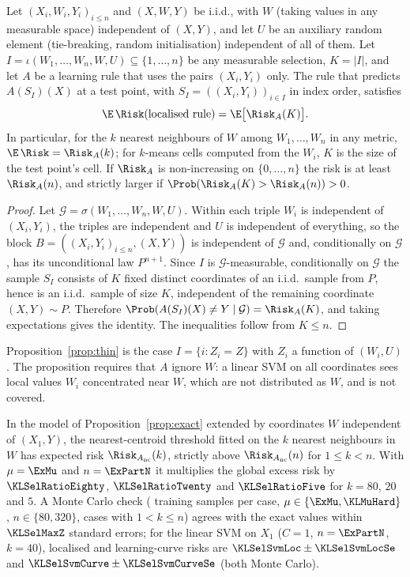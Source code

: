 \begin{proposition}\label{prop:select}
Let $(X_i,W_i,Y_i)_{i\le n}$ and $(X,W,Y)$ be i.i.d., with $W$ (taking values in any measurable space) independent of $(X,Y)$, and let $U$ be an auxiliary random element (tie-breaking, random initialisation) independent of all of them. Let $I=\iota(W_1,\dots,W_n,W,U)\subseteq\{1,\dots,n\}$ be any measurable selection, $K=|I|$, and let $A$ be a learning rule that uses the pairs $(X_i,Y_i)$ only. The rule that predicts $A(S_I)(X)$ at a test point, with $S_I=((X_i,Y_i))_{i\in I}$ in index order, satisfies
\[
\E\,\Risk(\text{localised rule})=\E\bigl[\Risk_A(K)\bigr].
\]
In particular, for the $k$ nearest neighbours of $W$ among $W_1,\dots,W_n$ in any metric, $\E\,\Risk=\Risk_A(k)$; for $k$-means cells computed from the $W_i$, $K$ is the size of the test point's cell. If $\Risk_A$ is non-increasing on $\{0,\dots,n\}$ the risk is at least $\Risk_A(n)$, and strictly larger if $\Prob(\Risk_A(K)>\Risk_A(n))>0$.
\end{proposition}
\begin{proof}
Let $\mathcal G=\sigma(W_1,\dots,W_n,W,U)$. Within each triple $W_i$ is independent of $(X_i,Y_i)$, the triples are independent and $U$ is independent of everything, so the block $B=((X_i,Y_i)_{i\le n},(X,Y))$ is independent of $\mathcal G$ and, conditionally on $\mathcal G$, has its unconditional law $P^{n+1}$. Since $I$ is $\mathcal G$-measurable, conditionally on $\mathcal G$ the sample $S_I$ consists of $K$ fixed distinct coordinates of an i.i.d.\ sample from $P$, hence is an i.i.d.\ sample of size $K$, independent of the remaining coordinate $(X,Y)\sim P$. Therefore $\Prob(A(S_I)(X)\neq Y\mid\mathcal G)=\Risk_A(K)$, and taking expectations gives the identity. The inequalities follow from $K\le n$.
\end{proof}

Proposition~\ref{prop:thin} is the case $I=\{i:Z_i=Z\}$ with $Z_i$ a function of $(W_i,U)$. The proposition requires that $A$ ignore $W$: a linear SVM on all coordinates sees local values $W_i$ concentrated near $W$, which are not distributed as $W$, and is not covered.

\begin{corollary}\label{cor:knnfree}
In the model of Proposition~\ref{prop:exact} extended by coordinates $W$ independent of $(X_1,Y)$, the nearest-centroid threshold fitted on the $k$ nearest neighbours in $W$ has expected risk $\Risk_{A_{\mathrm{nc}}}(k)$, strictly above $\Risk_{A_{\mathrm{nc}}}(n)$ for $1\le k<n$. With $\mu=\ExMu$ and $n=\ExPartN$ it multiplies the global excess risk by $\KLSelRatioEighty$, $\KLSelRatioTwenty$ and $\KLSelRatioFive$ for $k=80$, $20$ and $5$. A Monte Carlo check (\KLSelReps{} training samples per case, $\mu\in\{\ExMu,\KLMuHard\}$, $n\in\{80,320\}$, \KLSelNRows{} cases with $1<k\le n$) agrees with the exact values within $\KLSelMaxZ$ standard errors; for the linear SVM on $X_1$ ($C=1$, $n=\ExPartN$, $k=40$), localised and learning-curve risks are $\KLSelSvmLoc\pm\KLSelSvmLocSe$ and $\KLSelSvmCurve\pm\KLSelSvmCurveSe$ (both Monte Carlo).
\end{corollary}

